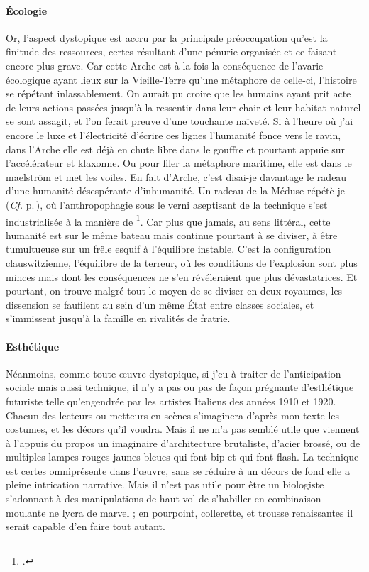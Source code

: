 \paragraph{Écologie}
Or, l’aspect dystopique est accru par la principale préoccupation qu’est la finitude des ressources, certes résultant d’une pénurie organisée et ce faisant encore plus grave.
Car cette Arche est à la fois la conséquence de l’avarie écologique ayant lieux sur la Vieille-Terre qu’une métaphore de celle-ci, l’histoire se répétant inlassablement. On aurait pu croire que les humains ayant prit acte de leurs actions passées jusqu’à la ressentir dans leur chair et leur habitat naturel se sont assagit, et l’on ferait preuve d’une touchante naïveté. Si à l’heure où j’ai encore le luxe et l’électricité d’écrire ces lignes l’humanité fonce vers le ravin, dans l’Arche elle est déjà en chute libre dans le gouffre et pourtant appuie sur l’accélérateur et klaxonne. Ou pour filer la métaphore maritime, elle est dans le maelström et met les voiles. En fait d’Arche, c’est disai-je davantage le radeau d’une humanité désespérante d’inhumanité. Un radeau de la Méduse répétè-je (\emph{Cf.} p.\,\pageref{par:radeaumeduse}), où l’anthropophagie sous le verni aseptisant de la technique s’est industrialisée à la manière de \footcite{soleilVert}. Car plus que jamais, au sens littéral, cette humanité est sur le même bateau mais continue pourtant à se diviser, à être tumultueuse sur un frêle esquif à l’équilibre instable. C’est la configuration clauswitzienne, l’équilibre de la terreur, où les conditions de l’explosion sont plus minces mais dont les conséquences ne s’en révéleraient que plus dévastatrices. Et pourtant, on trouve malgré tout le moyen de se diviser en deux royaumes, les dissension se faufilent au sein d’un même État entre classes sociales, et s’immissent jusqu’à la famille en rivalités de fratrie.

\paragraph{Esthétique}
Néanmoins, comme toute œuvre dystopique, si j’eu à traiter de l’anticipation sociale mais aussi technique, il n’y a pas ou pas de façon prégnante d’esthétique futuriste telle qu’engendrée par les artistes Italiens des années 1910 et 1920. Chacun des lecteurs ou metteurs en scènes s’imaginera d’après mon texte les costumes, et les décors qu’il voudra. Mais il ne m’a pas semblé utile que viennent à l’appuis du propos un imaginaire d’architecture brutaliste, d’acier brossé, ou de multiples lampes rouges jaunes bleues qui font bip et qui font flash. La technique est certes omniprésente dans l’œuvre, sans se réduire à un décors de fond elle a pleine intrication narrative. Mais il n’est pas utile pour être un biologiste s’adonnant à des manipulations  de haut vol de s’habiller en combinaison moulante ne lycra de marvel ; en pourpoint, collerette, et trousse renaissantes il serait capable d’en faire tout autant.

